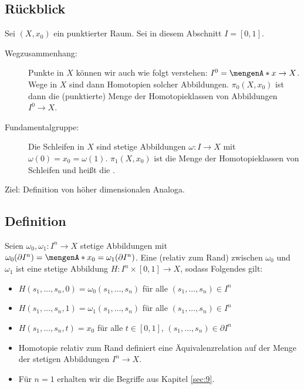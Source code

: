 \subsection[Rückblick auf die vorigen Kapitel]{Rückblick} %
\label{sub:141}
Sei $(X,x_0)$ ein punktierter Raum. Sei in diesem Abschnitt $I= [0,1]$.
\begin{description}
	\item[Wegzusammenhang:] Punkte in $X$ können wir auch wie folgt verstehen: $I^0 = \set{x} \to X$. Wege in $X$ sind dann Homotopien solcher Abbildungen. $\pi_0(X,x_0) $ 
	ist dann die (punktierte) Menge der Homotopieklassen von Abbildungen $I^0 \to X$.
	\item[Fundamentalgruppe:] Die Schleifen in $X$ sind stetige Abbildungen $\omega : I\to X$ mit $\omega(0)= x_0 = \omega(1)$. $\pi_1(X,x_0)$ ist die Menge der 
	Homotopieklassen von Schleifen und heißt die .
\end{description}
Ziel: Definition von höher dimensionalen Analoga.

\subsection[Definition: Homotopie relativ zum Rand von Abbildungen $I^n \to X$]{Definition} %
\label{sub:142}
Seien $\omega_0, \omega_1 : I^n \to X$ stetige Abbildungen mit $\omega_0(\partial I^n)= \set{x_0} = \omega_1(\partial I^n)$. Eine  (relativ zum Rand) 
zwischen $\omega_0$ und $\omega_1$ ist eine stetige Abbildung $H : I^n \times [0,1] \to X$, sodass Folgendes gilt:
\begin{itemize}
	\item $H(s_1, \ldots , s_n, 0) = \omega_0(s_1, \ldots , s_n)$ für alle $(s_1, \ldots , s_n) \in I^n$
	\item $H(s_1, \ldots , s_n, 1) = \omega_1(s_1, \ldots , s_n)$ für alle $(s_1, \ldots , s_n) \in I^n$
	\item $H(s_1, \ldots , s_n, t) = x_0$ für alle $t \in [0,1]$, $(s_1, \ldots , s_n) \in \partial I^n$
\end{itemize}
\begin{itemize}
	\item Homotopie relativ zum Rand definiert eine Äquivalenzrelation auf der Menge der stetigen Abbildungen $I^n \to X$.
	\item Für $n=1$ erhalten wir die Begriffe aus Kapitel \ref{sec:9}.
\end{itemize}

